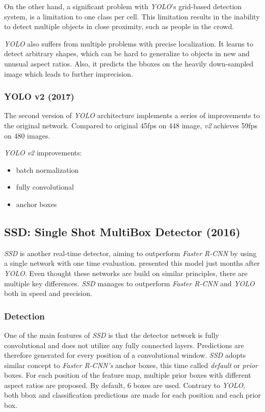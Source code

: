 On the other hand, a significant problem with \textit{YOLO}'s grid-based detection system, is a limitation to one class per cell. This limitation results in the inability to detect multiple objects in close proximity, such as people in the crowd. 

\textit{YOLO} also suffers from multiple problems with precise localization. It learns to detect arbitrary shapes, which can be hard to generalize to objects in new and unusual aspect ratios. Also, it predicts the bboxes on the heavily down-sampled image which leads to further imprecision. 

\subsubsection{YOLO v2 (2017)}
\citeauthor{bib:yolo9000} \cite{bib:yolo9000}
The second version of \textit{YOLO} architecture implements a series of improvements to the original network. Compared to original 45fps on 448 image, \textit{v2} achieves 59fps on 480 images. 

\textit{YOLO v2} improvements:
\begin{itemize}
    \item batch normalization
    \item fully convolutional
    \item anchor boxes
    
\end{itemize}


\subsection{SSD: Single Shot MultiBox Detector (2016)}
\label{sec:ssd}
\textit{SSD} is another real-time detector, aiming to outperform \textit{Faster R-CNN} by using a single network with one time evaluation. \citeauthor{bib:ssd} \cite{bib:ssd} presented this model just months after \textit{YOLO}. Even thought these networks are build on similar principles, there are multiple key differences. \textit{SSD} manages to outperform \textit{Faster R-CNN} and \textit{YOLO} both in speed and precision.

\subsubsection{Detection}
One of the main features of \textit{SSD} is that the detector network is fully convolutional and does not utilize any fully connected layers. Predictions are therefore generated for every position of a convolutional window. \textit{SSD} adopts similar concept to \textit{Faster R-CNN's} anchor boxes, this time called \textit{default} or \textit{prior} boxes. For each position of the feature map, multiple prior boxes with different aspect ratios are proposed. By default, 6 boxes are used. Contrary to \textit{YOLO}, both bbox and classification predictions are made for each position and each prior box.


